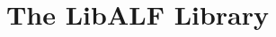 \documentclass[11pt,a4paper]{book}
\title{The LibALF Library}
\begin{document}
\maketitle{}

\graphicspath{{images/}}


\end{document}
